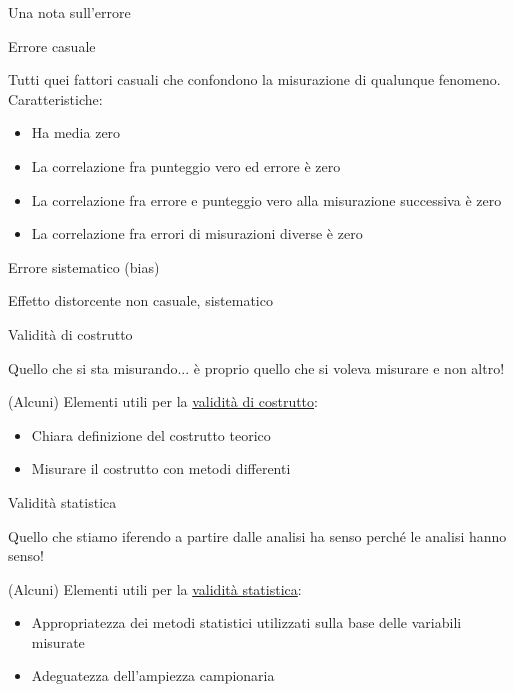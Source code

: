 \documentclass[compress]{beamer}
\begin{document}
\begin{frame}{Una nota sull'errore}
	\begin{block}{Errore casuale}
		
		Tutti quei fattori casuali che confondono la misurazione di qualunque fenomeno. \\
		Caratteristiche: 
		\begin{itemize}
			\item Ha media zero
		\item 	La correlazione fra punteggio vero ed errore è zero
			\item La correlazione fra errore e punteggio vero alla misurazione successiva è zero
			\item La correlazione fra errori di misurazioni diverse è zero
			
		\end{itemize}
		
	\end{block}
	
		\begin{block}{Errore sistematico (bias)}
		
		Effetto distorcente non casuale, sistematico
	\end{block}
\end{frame}

\begin{frame}

\begin{block}{Validità di costrutto}
	
	Quello che si sta misurando... è proprio quello che si voleva misurare e non altro!
	
	(Alcuni) Elementi utili per la \underline{validità di costrutto}:
	\begin{itemize}
		\item Chiara definizione del costrutto teorico
		\item Misurare il costrutto con metodi differenti
	\end{itemize} 
\end{block}	

\pause
\begin{block}{Validità statistica}
	
	Quello che stiamo iferendo a partire dalle analisi ha senso perché le analisi hanno senso! 
	
	(Alcuni) Elementi utili per la \underline{validità statistica}:
	\begin{itemize}
		\item Appropriatezza dei metodi statistici utilizzati sulla base delle variabili misurate
		\item Adeguatezza dell'ampiezza campionaria
	\end{itemize} 
	
\end{block}
\end{frame}
\end{document}
